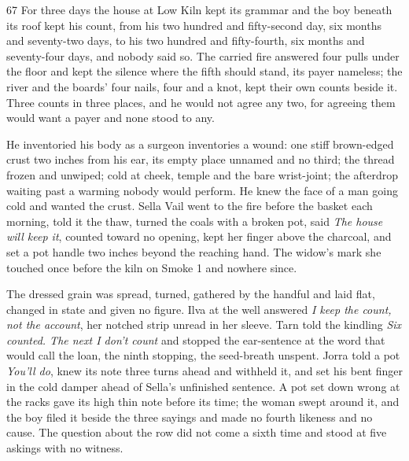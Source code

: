 
\scenebreak


\scenebreak


\scenebreak

\CRtailpiece
\begin{CRchronicle}{67}
For three days the house at Low Kiln kept its grammar and the boy beneath its roof kept his count, from his two hundred and fifty-second day, six months and seventy-two days, to his two hundred and fifty-fourth, six months and seventy-four days, and nobody said so. The carried fire answered four pulls under the floor and kept the silence where the fifth should stand, its payer nameless; the river and the boards’ four nails, four and a knot, kept their own counts beside it. Three counts in three places, and he would not agree any two, for agreeing them would want a payer and none stood to any.

He inventoried his body as a surgeon inventories a wound: one stiff brown-edged crust two inches from his ear, its empty place unnamed and no third; the thread frozen and unwiped; cold at cheek, temple and the bare wrist-joint; the afterdrop waiting past a warming nobody would perform. He knew the face of a man going cold and wanted the crust. Sella Vail went to the fire before the basket each morning, told it the thaw, turned the coals with a broken pot, said \emph{The house will keep it}, counted toward no opening, kept her finger above the charcoal, and set a pot handle two inches beyond the reaching hand. The widow’s mark she touched once before the kiln on Smoke 1 and nowhere since.

The dressed grain was spread, turned, gathered by the handful and laid flat, changed in state and given no figure. Ilva at the well answered \emph{I keep the count, not the account}, her notched strip unread in her sleeve. Tarn told the kindling \emph{Six counted. The next I don’t count} and stopped the ear-sentence at the word that would call the loan, the ninth stopping, the seed-breath unspent. Jorra told a pot \emph{You’ll do}, knew its note three turns ahead and withheld it, and set his bent finger in the cold damper ahead of Sella’s unfinished sentence. A pot set down wrong at the racks gave its high thin note before its time; the woman swept around it, and the boy filed it beside the three sayings and made no fourth likeness and no cause. The question about the row did not come a sixth time and stood at five askings with no witness.


\end{CRchronicle}
